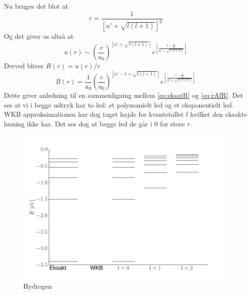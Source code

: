 Nu bruges det blot at
\begin{equation}
  \varepsilon = \frac{1}{\left[n'+\sqrt{l(l+1)}\right]^2}
\end{equation}
Og det giver os altså at
\begin{equation}
  u(r) \sim {\left(\frac{r}{a_0}\right)}^{\left[n'+\sqrt{l(l+1)}\right]} e^{\left[\frac{1-\frac{r}{a_0}}{n'+\sqrt{l(l+1)}}\right]}
\end{equation}
Derved bliver $R(r) = u(r)/r$
\begin{equation}
  R(r) = \frac{1}{a_0}{\left(\frac{r}{a_0}\right)}^{\left[n'-1+\sqrt{l(l+1)}\right]} e^{\left[\frac{1-\frac{r}{a_0}}{n'+\sqrt{l(l+1)}}\right]}
  \label{eq:rAfR}
\end{equation}
Dette giver anledning til en sammenligning mellem \cref{eq:eksatR} og \cref{eq:rAfR}. Det ses at vi i begge udtryk har to led: et polynomielt led og et eksponentielt led. WKB approksimationen har dog taget højde for kvantetallet $l$ hvilket den eksakte løsning ikke har. Det ses dog at begge led de går i $0$ for store $r$.

\begin{figure}[h!]
    \centering
    \includegraphics[width=\columnwidth]{energyPlot}
    \caption{Hydrogen}
    \label{fig:hydrogen}
\end{figure}


%
